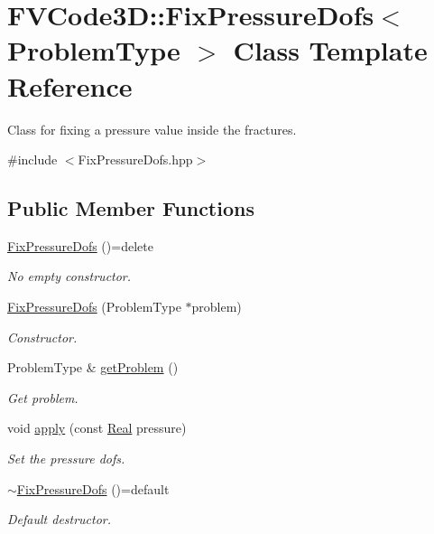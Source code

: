 \hypertarget{classFVCode3D_1_1FixPressureDofs}{}\section{F\+V\+Code3D\+:\+:Fix\+Pressure\+Dofs$<$ Problem\+Type $>$ Class Template Reference}
\label{classFVCode3D_1_1FixPressureDofs}


Class for fixing a pressure value inside the fractures.  




{\ttfamily \#include $<$Fix\+Pressure\+Dofs.\+hpp$>$}

\subsection*{Public Member Functions}
\begin{DoxyCompactItemize}
\item 
\hyperlink{classFVCode3D_1_1FixPressureDofs_a04fe8d95e2ef14366032a712a5015fdb}{Fix\+Pressure\+Dofs} ()=delete
\begin{DoxyCompactList}\small\item\em No empty constructor. \end{DoxyCompactList}\item 
\hyperlink{classFVCode3D_1_1FixPressureDofs_a2718e4b7ee481b3fac51c39dc900e036}{Fix\+Pressure\+Dofs} (Problem\+Type $\ast$problem)
\begin{DoxyCompactList}\small\item\em Constructor. \end{DoxyCompactList}\item 
Problem\+Type \& \hyperlink{classFVCode3D_1_1FixPressureDofs_a45678898ff37d7a189233bda0d4d6773}{get\+Problem} ()
\begin{DoxyCompactList}\small\item\em Get problem. \end{DoxyCompactList}\item 
void \hyperlink{classFVCode3D_1_1FixPressureDofs_a3393776b99ad339672ba99cfc5c200e2}{apply} (const \hyperlink{namespaceFVCode3D_a40c1f5588a248569d80aa5f867080e83}{Real} pressure)
\begin{DoxyCompactList}\small\item\em Set the pressure dofs. \end{DoxyCompactList}\item 
\hyperlink{classFVCode3D_1_1FixPressureDofs_af39545b363f6eb33c5cbffc2fe1d98c9}{$\sim$\+Fix\+Pressure\+Dofs} ()=default
\begin{DoxyCompactList}\small\item\em Default destructor. \end{DoxyCompactList}\end{DoxyCompactItemize}

